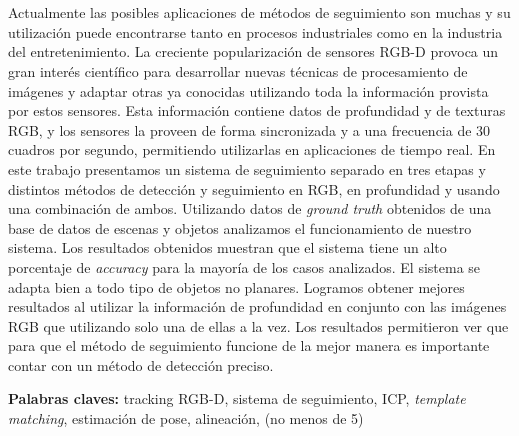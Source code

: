 \chapter*{\runtitulo}

\noindent Actualmente las posibles aplicaciones de métodos de seguimiento son muchas y su utilización puede encontrarse tanto en procesos industriales como en la industria del entretenimiento. La creciente popularización de sensores RGB-D provoca un gran interés científico para desarrollar nuevas técnicas de procesamiento de imágenes y adaptar otras ya conocidas utilizando toda la información provista por estos sensores. Esta información contiene datos de profundidad y de texturas RGB, y los sensores la proveen de forma sincronizada y a una frecuencia de 30 cuadros por segundo, permitiendo utilizarlas en aplicaciones de tiempo real. En este trabajo presentamos un sistema de seguimiento separado en tres etapas y distintos métodos de detección y seguimiento en RGB, en profundidad y usando una combinación de ambos. Utilizando datos de \textit{ground truth} obtenidos de una base de datos de escenas y objetos analizamos el funcionamiento de nuestro sistema. Los resultados obtenidos muestran que el sistema tiene un alto porcentaje de \textit{accuracy} para la mayoría de los casos analizados. El sistema se adapta bien a todo tipo de objetos no planares. Logramos obtener mejores resultados al utilizar la información de profundidad en conjunto con las imágenes RGB que utilizando solo una de ellas a la vez. Los resultados permitieron ver que para que el método de seguimiento funcione de la mejor manera es importante contar con un método de detección preciso.



\bigskip

\noindent\textbf{Palabras claves:} tracking RGB-D, sistema de seguimiento, ICP, \textit{template matching}, estimación de pose, alineación, (no menos de 5)
